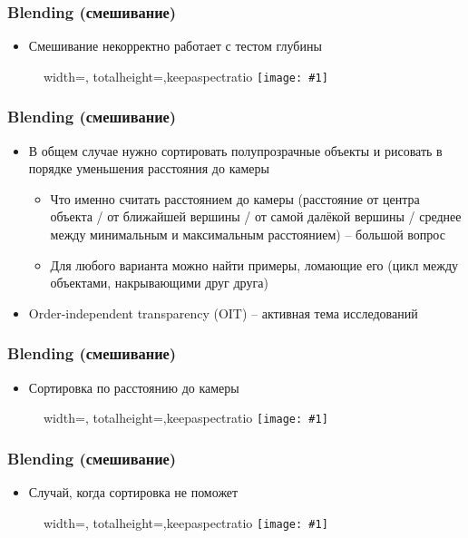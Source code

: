 \documentclass[10pt]{beamer}
\newcommand{\slideimage}[1]{
  \begin{figure}
    \begin{adjustbox}{width=\textwidth, totalheight=\textheight-2\baselineskip-2\baselineskip,keepaspectratio}
      \texttt{[image: \#1]}
    \end{adjustbox}
  \end{figure}
}
\begin{document}
\begin{frame}[fragile]
\frametitle{Blending (смешивание)}
\begin{itemize}
\item Смешивание некорректно работает с тестом глубины
\end{itemize}
\slideimage{blending_incorrect_order.png}
\end{frame}

\begin{frame}[fragile]
\frametitle{Blending (смешивание)}
\begin{itemize}
\item В общем случае нужно сортировать полупрозрачные объекты и рисовать в порядке уменьшения расстояния до камеры
\pause
\begin{itemize}
\item Что именно считать расстоянием до камеры (расстояние от центра объекта / от ближайшей вершины / от самой далёкой вершины / среднее между минимальным и максимальным расстоянием) -- большой вопрос
\pause
\item Для любого варианта можно найти примеры, ломающие его (цикл между объектами, накрывающими друг друга)
\end{itemize}
\pause
\item Order-independent transparency (OIT) -- активная тема исследований
\end{itemize}
\end{frame}

\begin{frame}[fragile]
\frametitle{Blending (смешивание)}
\begin{itemize}
\item Сортировка по расстоянию до камеры
\end{itemize}
\slideimage{blending_sorted.png}
\end{frame}

\begin{frame}[fragile]
\frametitle{Blending (смешивание)}
\begin{itemize}
\item Случай, когда сортировка не поможет
\end{itemize}
\slideimage{painters.png}
\end{frame}
\end{document}
